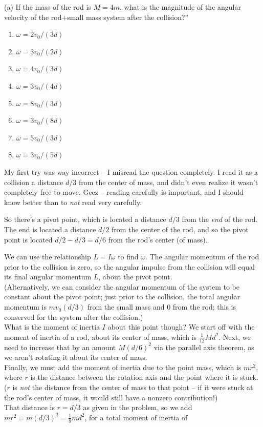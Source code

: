 \documentclass[8.01x]{subfiles}
\begin{document}
(a) If the mass of the rod is $M=4m$, what is the magnitude of the angular velocity of the rod+small mass system after the collision?''

\begin{enumerate}
\item $\omega = 2 v_0/(3 d)$
\item $\omega = 3 v_0/(2 d)$
\item $\omega = 4 v_0/(3 d)$
\item $\omega = 3 v_0/(4 d)$
\item $\omega = 8 v_0/(3 d)$
\item $\omega = 3 v_0/(8 d)$
\item $\omega = 5 v_0/(3 d)$
\item $\omega = 3 v_0/(5 d)$
\end{enumerate}

My first try was way incorrect -- I misread the question completely. I read it as a collision a distance $d/3$ from the center of mass, and didn't even realize it wasn't completely free to move. Geez -- reading carefully is important, and I should know better than to \emph{not} read very carefully.

So there's a pivot point, which is located a distance $d/3$ from the \emph{end} of the rod. The end is located a distance $d/2$ from the center of the rod, and so the pivot point is located $d/2 - d/3 = d/6$ from the rod's center (of mass).

We can use the relationship $L = I \omega$ to find $\omega$. The angular momentum of the rod prior to the collision is zero, so the angular impulse from the collision will equal its final angular momentum $L$, about the pivot point.\\
(Alternatively, we can consider the angular momentum of the system to be constant about the pivot point; just prior to the collision, the total angular momentum is $m v_0 (d/3)$ from the small mass and $0$ from the rod; this is conserved for the system after the collision.)\\
What is the moment of inertia $I$ about this point though? We start off with the moment of inertia of a rod, about its center of mass, which is $\frac{1}{12} M d^2$. Next, we need to increase that by an amount $M (d/6)^2$ via the parallel axis theorem, as we aren't rotating it about its center of mass.\\
Finally, we must add the moment of inertia due to the point mass, which is $m r^2$, where $r$ is the distance between the rotation axis and the point where it is stuck. ($r$ is \emph{not} the distance from the center of mass to that point -- if it were stuck at the rod's center of mass, it would still have a nonzero contribution!)\\
That distance is $r = d/3$ as given in the problem, so we add $m r^2 = m (d/3)^2 = \frac{1}{9} m d^2$, for a total moment of inertia of
\end{document}
